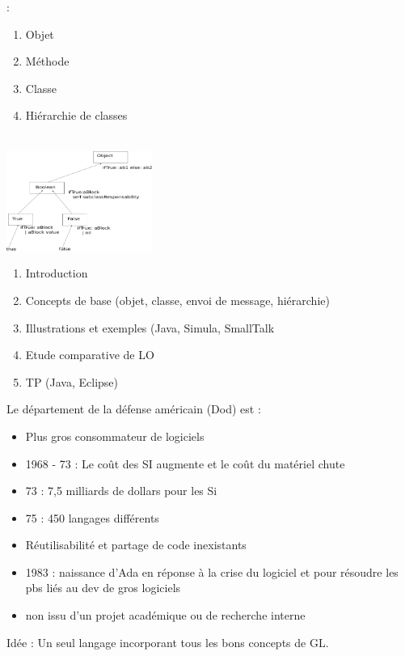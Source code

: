  : 
\begin{enumerate}
	\item Objet
	\item Méthode
	\item Classe
	\item Hiérarchie de classes
\end{enumerate}

\\
\includegraphics[width=180px]{Images/fig1.pdf}

\begin{enumerate}
	\item Introduction
	\item Concepts de base (objet, classe, envoi de message, hiérarchie)
	\item Illustrations et exemples (Java, Simula, SmallTalk
	\item Etude comparative de LO
	\item TP (Java, Eclipse)
\end{enumerate}

Le département de la défense américain (Dod) est : 
\begin{itemize}
	\item Plus gros consommateur de logiciels
	\item 1968 - 73 : Le coût des SI augmente et le coût du matériel chute
	\item 73 : 7,5 milliards de dollars pour les Si
	\item 75 : 450 langages différents
	\item Réutilisabilité et partage de code inexistants
	\item 1983 : naissance d'Ada en réponse à la crise du logiciel et pour résoudre les pbs liés au dev de gros logiciels
	\item non issu d'un projet académique ou de recherche interne
\end{itemize}
Idée : Un seul langage incorporant tous les bons concepts de GL.\\

